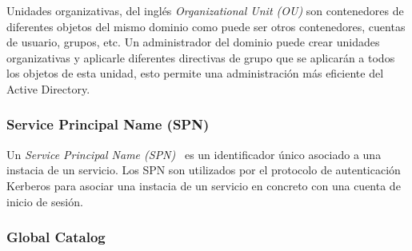 Unidades organizativas, del inglés {\it Organizational Unit (OU)} son contenedores de diferentes objetos del mismo dominio como puede ser otros contenedores, cuentas de usuario, grupos, etc. Un administrador del dominio puede crear unidades organizativas y aplicarle diferentes directivas de grupo que se aplicarán a todos los objetos de esta unidad, esto permite una administración más eficiente del Active Directory. 

\subsubsection{Service Principal Name (SPN)}

Un {\it Service Principal Name (SPN)}~\cite{Capitulo4:SPN} es un identificador único asociado a una instacia de un servicio. Los SPN son utilizados por el protocolo de autenticación Kerberos para asociar una instacia de un servicio en concreto con una cuenta de inicio de sesión.  

\subsubsection{Global Catalog}


